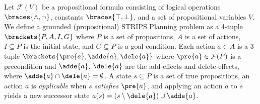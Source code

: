 Let $\mathcal{F}(V)$ be a propositional formula consisting of
 logical operations $\braces{\land,\lnot}$,
 constants $\braces{\top,\bot}$, and
 a set of propositional variables $V$.
We define a grounded (propositional) STRIPS Planning problem
as a 4-tuple $\brackets{P,A,I,G}$
where
 $P$ is a set of propositions,
 $A$ is a set of actions,
 $I\subseteq P$ is the initial state, and
 $G\subseteq P$ is a goal condition.
Each action $a\in A$ is a 3-tuple $\brackets{\pre{a},\adde{a},\dele{a}}$ where
 $\pre{a} \in \mathcal{F}(P)$ is a precondition and
 $\adde{a}$, $\dele{a}$ are the add-effects and delete-effects, where $\adde{a} \cap \dele{a} = \emptyset$.
A state $s\subseteq P$ is a set of true propositions,
an action $a$ is \emph{applicable} when $s$ \emph{satisfies} $\pre{a}$,
and applying an action $a$ to $s$ yields a new successor state
$a(s) = (s \setminus \dele{a}) \cup \adde{a}$.
